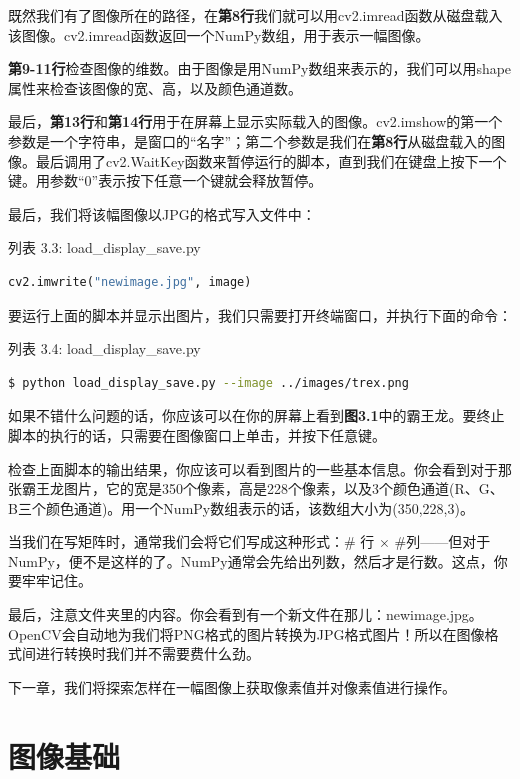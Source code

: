 \documentclass[color=cyan,mathpazo,titlestyle=hang]{elegantbook}
\begin{document}
既然我们有了图像所在的路径，在\textbf{第8行}我们就可以用cv2.imread函数从磁盘载入该图像。cv2.imread函数返回一个NumPy数组，用于表示一幅图像。

\textbf{第9-11行}检查图像的维数。由于图像是用NumPy数组来表示的，我们可以用shape属性来检查该图像的宽、高，以及颜色通道数。

最后，\textbf{第13行}和\textbf{第14行}用于在屏幕上显示实际载入的图像。cv2.imshow的第一个参数是一个字符串，是窗口的“名字”；第二个参数是我们在\textbf{第8行}从磁盘载入的图像。最后调用了cv2.WaitKey函数来暂停运行的脚本，直到我们在键盘上按下一个键。用参数“0”表示按下任意一个键就会释放暂停。

最后，我们将该幅图像以JPG的格式写入文件中：

列表 3.3: load\_display\_save.py

\begin{lstlisting}[language=python]
cv2.imwrite("newimage.jpg", image)
\end{lstlisting}

要运行上面的脚本并显示出图片，我们只需要打开终端窗口，并执行下面的命令：

列表 3.4: load\_display\_save.py

\begin{lstlisting}[language=bash]
$ python load_display_save.py --image ../images/trex.png
\end{lstlisting}

如果不错什么问题的话，你应该可以在你的屏幕上看到\textbf{图3.1}中的霸王龙。要终止脚本的执行的话，只需要在图像窗口上单击，并按下任意键。

检查上面脚本的输出结果，你应该可以看到图片的一些基本信息。你会看到对于那张霸王龙图片，它的宽是350个像素，高是228个像素，以及3个颜色通道(R、G、B三个颜色通道)。用一个NumPy数组表示的话，该数组大小为(350,228,3)。

当我们在写矩阵时，通常我们会将它们写成这种形式：\# 行 $\times$ \#列——但对于NumPy，便不是这样的了。NumPy通常会先给出列数，然后才是行数。这点，你要牢牢记住。

最后，注意文件夹里的内容。你会看到有一个新文件在那儿：newimage.jpg。OpenCV会自动地为我们将PNG格式的图片转换为JPG格式图片！所以在图像格式间进行转换时我们并不需要费什么劲。

下一章，我们将探索怎样在一幅图像上获取像素值并对像素值进行操作。

\chapter{图像基础}
\end{document}
